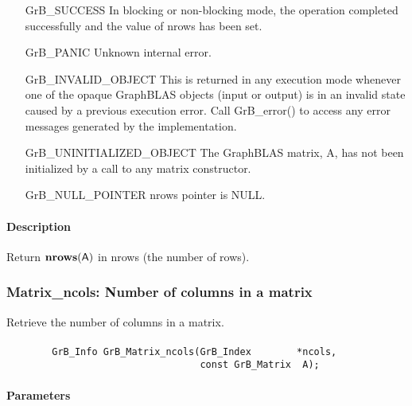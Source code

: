 \begin{itemize}[leftmargin=2.1in]
    \item[{\sf GrB\_SUCCESS}]   In blocking or non-blocking mode, the operation 
    completed successfully and the value of {\sf nrows} has been set.

    \item[{\sf GrB\_PANIC}]     Unknown internal error.
    
    \item[{\sf GrB\_INVALID\_OBJECT}] This is returned in any execution mode 
    whenever one of the opaque GraphBLAS objects (input or output) is in an invalid 
    state caused by a previous execution error.  Call {\sf GrB\_error()} to access 
    any error messages generated by the implementation.

    \item[{\sf GrB\_UNINITIALIZED\_OBJECT}]  The GraphBLAS matrix, {\sf A}, has 
    not been initialized by a call to any matrix constructor.
    
    \item[{\sf GrB\_NULL\_POINTER}]  {\sf nrows} pointer is {\sf NULL}.
\end{itemize}

\paragraph{Description}

Return $\mathbf{nrows}({\sf A})$ in {\sf nrows} (the number of rows).

\subsubsection{{\sf Matrix\_ncols}: Number of columns in a matrix}

Retrieve the number of columns in a matrix.

\paragraph{\syntax}

\begin{verbatim}
        GrB_Info GrB_Matrix_ncols(GrB_Index        *ncols,
                                  const GrB_Matrix  A);
\end{verbatim}

\paragraph{Parameters}

